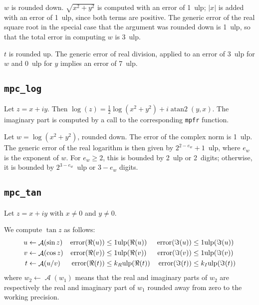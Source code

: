 \documentclass {article}
\newcommand {\mpfr}{\texttt {mpfr}}
\newcommand {\ulp}[1]{#1~ulp}
\newcommand {\atantwo}{\operatorname {atan2}}
\newcommand {\Ulp}{{\rm ulp}}
\DeclareMathOperator{\error}{error}
\DeclareMathOperator{\A}{\mathcal A}
\begin{document}
$w$ is rounded down. $\sqrt {x^2 + y^2}$ is computed with an error of \ulp{1}; $|x|$ is added with an error of \ulp{1}, since both terms are positive. The generic error of the real square root in the special case that the argument was rounded down is \ulp{1}, so that the total error in computing $w$ is \ulp{3}.

$t$ is rounded up. The generic error of real division, applied to an error of \ulp{3} for $w$ and \ulp{0} for $y$ implies an error of \ulp{7}.


\subsection {\texttt {mpc\_log}}

Let $z = x + i y$. Then $\log (z) = \frac {1}{2} \log (x^2 + y^2) + i \atantwo (y, x)$. The imaginary part is computed by a call to the corresponding {\mpfr} function.

Let $w = \log (x^2 + y^2)$, rounded down. The error of the complex norm is \ulp{1}. The generic error of the real logarithm is then given by \ulp{$2^{2 - e_w} + 1$}, where $e_w$ is the exponent of $w$. For $e_w \geq 2$, this is bounded by \ulp{2} or 2~digits; otherwise, it is bounded by \ulp{$2^{3 - e_w}$} or $3 - e_w$ digits.

\subsection {\texttt {mpc\_tan}}

Let $z = x + i y$ with $x \neq 0$ and $y \neq 0$.

We compute $\tan z$ as follows:
\begin{align*}
u &\leftarrow \A(\sin z) &\error(\Re(u)) &\leq 1 \Ulp(\Re(u))
&\error(\Im(u)) &\leq 1 \Ulp(\Im(u))
\\
v &\leftarrow \A(\cos z) &\error(\Re(v)) &\leq 1 \Ulp(\Re(v))
&\error(\Im(v)) &\leq 1 \Ulp(\Im(v))
\\
t &\leftarrow \A(u/v) &\error(\Re(t)) &\leq k_R \Ulp(\Re(t))
&\error(\Im(t)) &\leq k_I \Ulp(\Im(t))
\end{align*}
where $w_2 \leftarrow \A(w_1)$ means that the real and imaginary parts of
$w_2$ are respectively the real and imaginary part of $w_1$ rounded away from
zero to the working precision.
\end{document}
